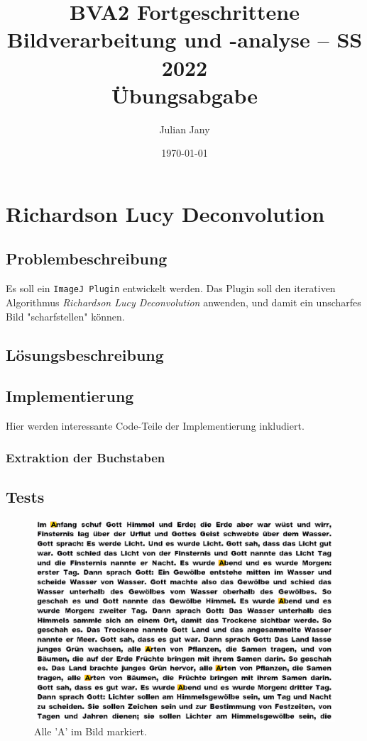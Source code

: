\documentclass[german,notitlepage,smartquotes]{hgbreport}
\author{Julian Jany}                        %
\title{BVA2 Fortgeschrittene Bildverarbeitung und -analyse -- SS 2022\\ %
				Übungsabgabe \arabic{chapter}}
\date{\today}
\begin{document}
\maketitle



\section{Richardson Lucy Deconvolution}

\subsection{Problembeschreibung}

Es soll ein \texttt{ImageJ Plugin} entwickelt werden. 
Das Plugin soll den iterativen Algorithmus \textit{Richardson Lucy Deconvolution} anwenden, und damit ein \zB unscharfes Bild "scharfstellen" können. 

\subsection{Lösungsbeschreibung}

\subsection{Implementierung}

Hier werden interessante Code-Teile der Implementierung inkludiert.

\subsubsection{Extraktion der Buchstaben}

\subsection{Tests}

\begin{figure}[h]
\centering
\includegraphics[width=.7\textwidth]{test-01-A}
\caption{Alle 'A' im Bild markiert.}
\label{fig:test-01}
\end{figure}
\end{document}

